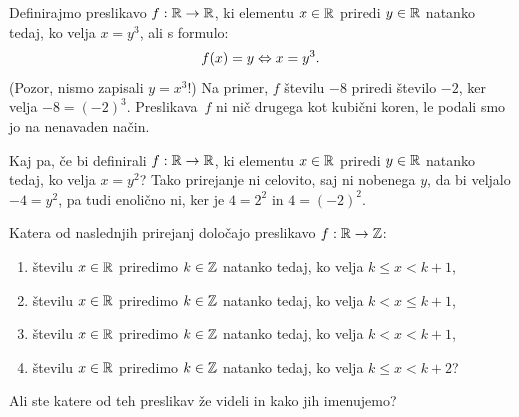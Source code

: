 \begin{zgled}
  Definirajmo preslikavo $f : \mathbb{R} \to \mathbb{R}$, ki elementu $x \in \mathbb{R}$ priredi $y \in \mathbb{R}$ natanko tedaj,
  ko velja $x = y^3$, ali s formulo:
  \begin{equation*}
    f(x) = y \Leftrightarrow x = y^3.
  \end{equation*}
  (Pozor, nismo zapisali $y = x^3$!) Na primer, $f$ številu $-8$ priredi število $-2$, ker velja
  $-8 = (-2)^3$. Preslikava~$f$ ni nič drugega kot kubični koren, le podali smo jo na nenavaden način.
\end{zgled}

\begin{zgled}
  Kaj pa, če bi definirali $f : \mathbb{R} \to \mathbb{R}$, ki elementu $x \in \mathbb{R}$ priredi $y \in \mathbb{R}$ natanko tedaj,
  ko velja $x = y^2$? Tako prirejanje ni celovito, saj ni nobenega $y$, da bi veljalo $-4 = y^2$, pa tudi enolično ni,
  ker je $4 = 2^2$ in $4 = (-2)^2$.
\end{zgled}

\begin{vaja}
  Katera od naslednjih prirejanj določajo preslikavo $f : \mathbb{R} \to \mathbb{Z}$:
  \begin{enumerate}
  \item številu $x \in \mathbb{R}$ priredimo $k \in \mathbb{Z}$ natanko tedaj, ko velja $k \leq x < k + 1$,
  \item številu $x \in \mathbb{R}$ priredimo $k \in \mathbb{Z}$ natanko tedaj, ko velja $k < x \leq k + 1$,
  \item številu $x \in \mathbb{R}$ priredimo $k \in \mathbb{Z}$ natanko tedaj, ko velja $k < x < k + 1$,
  \item številu $x \in \mathbb{R}$ priredimo $k \in \mathbb{Z}$ natanko tedaj, ko velja $k \leq x < k + 2$?
  \end{enumerate}
  Ali ste katere od teh preslikav že videli in kako jih imenujemo?
\end{vaja}

